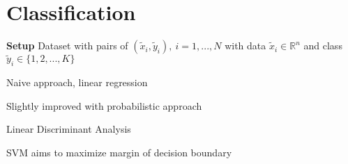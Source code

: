 \section{Classification}

\textbf{Setup} Dataset with pairs of
$(\tilde{x}_i,\tilde{y}_i),\ i=1,...,N$
with data $\tilde{x}_i\in\mathbb{R}^{n}$
and class $\tilde{y}_i\in\{1,2,...,K\}$

Naive approach, linear regression

Slightly improved with probabilistic approach

Linear Discriminant Analysis

SVM aims to maximize margin of decision boundary


